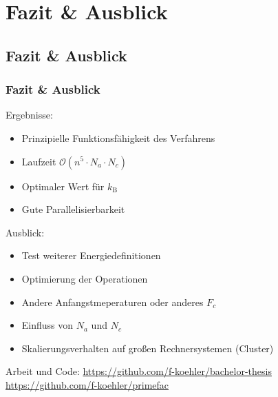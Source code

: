 \section{Fazit \& Ausblick}
\subsection*{Fazit \& Ausblick}
\begin{frame}[allowframebreaks]
  \frametitle{Fazit \& Ausblick}
  Ergebnisse:
  \begin{itemize}
    \setlength{\itemsep}{0.3cm}

    \item Prinzipielle Funktionsfähigkeit des Verfahrens
    \item Laufzeit $\mathcal{O}\left(n^5\cdot N_a\cdot N_c\right)$
    \item Optimaler Wert für $k_\mathrm{B}$
    \item Gute Parallelisierbarkeit
  \end{itemize}
  \framebreak{}

  Ausblick:
  \begin{itemize}
    \setlength{\itemsep}{0.3cm}

    \item Test weiterer Energiedefinitionen
    \item Optimierung der Operationen
    \item Andere Anfangstmeperaturen oder anderes $F_c$
    \item Einfluss von $N_a$ und $N_c$
    \item Skalierungsverhalten auf großen Rechnersystemen (Cluster)
  \end{itemize}
  \vspace{1cm}

  Arbeit und Code:
  \url{https://github.com/f-koehler/bachelor-thesis}
  \url{https://github.com/f-koehler/primefac}
\end{frame}

